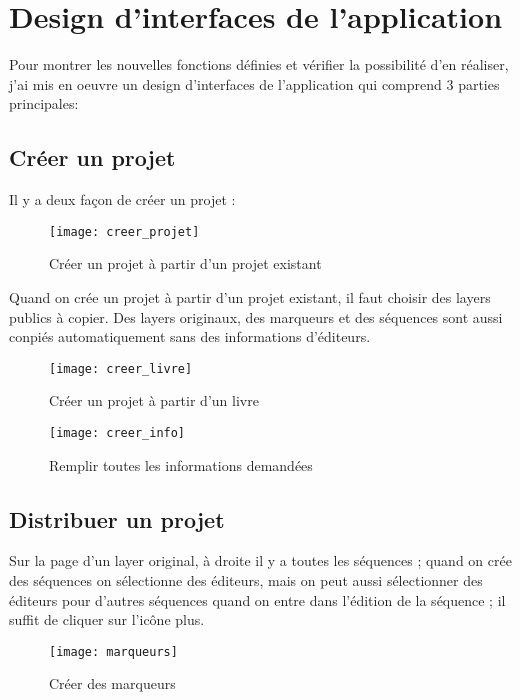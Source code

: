 \section{Design d'interfaces de l'application}

Pour montrer les nouvelles fonctions définies et vérifier la possibilité d'en réaliser, j'ai mis en oeuvre un design d'interfaces de l'application qui comprend 3 parties principales: 

\subsection{Créer un projet}

Il y a deux façon de créer un projet :

\begin{figure}[H]
\centering
\texttt{[image: creer\_projet]}
\caption{Créer un projet à partir d'un projet existant}
\end{figure}

Quand on crée un projet à partir d'un projet existant, il faut choisir des layers publics à copier. Des layers originaux, des marqueurs et des séquences sont aussi conpiés automatiquement sans des informations d'éditeurs. 

\begin{figure}[H]
\centering
\texttt{[image: creer\_livre]}
\caption{Créer un projet à partir d'un livre}
\end{figure}

\begin{figure}[H]
\centering
\texttt{[image: creer\_info]}
\caption{Remplir toutes les informations demandées}
\end{figure}

\subsection{Distribuer un projet}

Sur la page d'un layer original, à droite il y a toutes les séquences ; quand on crée des séquences on sélectionne des éditeurs, mais on peut aussi sélectionner des éditeurs pour d'autres séquences quand on entre dans l'édition de la séquence ; il suffit de cliquer sur l'icône plus.

\begin{figure}[H]
\centering
\texttt{[image: marqueurs]}
\caption{Créer des marqueurs}
\end{figure}

